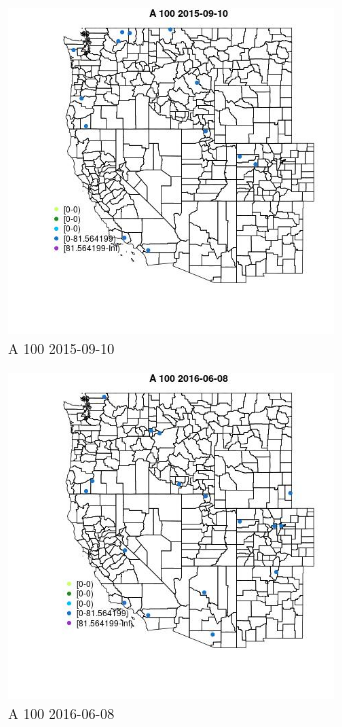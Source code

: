 \begin{figure} 
\centering  
\includegraphics[width=0.77\textwidth]{Code_Outputs/Report_ML_input_PM25_Step4_part_e_de_duplicated_aves_MapObsA_1002015-09-10.jpg} 
\caption{\label{fig:Report_ML_input_PM25_Step4_part_e_de_duplicated_avesMapObsA_1002015-09-10}A 100 2015-09-10} 
\end{figure} 
 

\begin{figure} 
\centering  
\includegraphics[width=0.77\textwidth]{Code_Outputs/Report_ML_input_PM25_Step4_part_e_de_duplicated_aves_MapObsA_1002016-06-08.jpg} 
\caption{\label{fig:Report_ML_input_PM25_Step4_part_e_de_duplicated_avesMapObsA_1002016-06-08}A 100 2016-06-08} 
\end{figure} 
 


